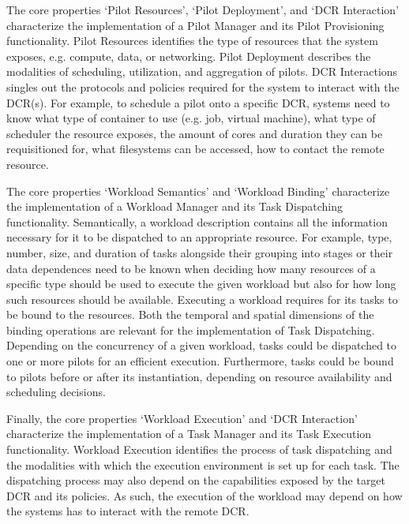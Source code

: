 \documentclass{sig-alternate}
\begin{document}
The core properties `Pilot Resources', `Pilot Deployment', and `DCR Interaction'
characterize the implementation of a Pilot Manager and its Pilot Provisioning
functionality. Pilot Resources identifies the type of resources that the \pilot
system exposes, e.g. compute, data, or networking. Pilot Deployment describes
the modalities of scheduling, utilization, and aggregation of pilots.  DCR
Interactions singles out the protocols and policies required for the \pilot
system to interact with the DCR(s). For example, to schedule a pilot onto a
specific DCR, \pilot systems need to know what type of container to use
(e.g. job, virtual machine), what type of scheduler the resource exposes, the
amount of cores and duration they can be requisitioned for, what filesystems can
be accessed, how to contact the remote resource.    

The core properties `Workload Semantics' and `Workload Binding' characterize the
implementation of a Workload Manager and its Task Dispatching functionality.
Semantically, a workload description contains all the information necessary for
it to be dispatched to an appropriate resource.  For example, type, number,
size, and duration of tasks alongside their grouping into stages or their data
dependences need to be known when deciding how many resources of a specific type
should be used to execute the given workload but also for how long such
resources should be available. Executing a workload requires for its tasks to
be bound to the resources. Both the temporal and spatial dimensions of the
binding operations are relevant for the implementation of Task
Dispatching. Depending on the concurrency of a given workload, tasks could be
dispatched to one or more pilots for an efficient execution. Furthermore, tasks
could be bound to pilots before or after its instantiation, depending on
resource availability and scheduling decisions.

Finally, the core properties `Workload Execution' and `DCR Interaction'
characterize the implementation of a Task Manager and its Task Execution
functionality. Workload Execution identifies the process of task dispatching and
the modalities with which the execution environment is set up for each task. The
dispatching process may also depend on the capabilities exposed by the target
DCR and its policies. As such, the execution of the workload may depend on how
the \pilot systems has to interact with the remote DCR. 
\end{document}
